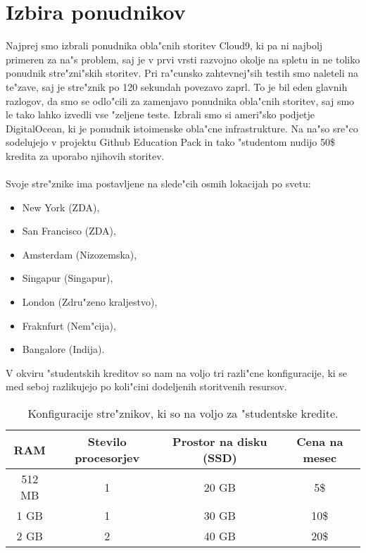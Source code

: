 \null
\vfill
\clearpage

\section{Izbira ponudnikov}
Najprej smo izbrali ponudnika obla"cnih storitev Cloud9, ki pa ni najbolj primeren za na"s problem, saj je v prvi vrsti razvojno okolje na spletu in ne toliko ponudnik stre"zni"skih storitev. Pri ra"cunsko zahtevnej"sih testih smo naleteli na te"zave, saj je stre"znik po 120 sekundah povezavo zaprl. To je bil eden glavnih razlogov, da smo se odlo"cili za zamenjavo ponudnika obla"cnih storitev, saj smo le tako lahko izvedli vse "zeljene teste. Izbrali smo si ameri"sko podjetje DigitalOcean, ki je ponudnik istoimenske obla"cne infrastrukture. Na na"so sre"co sodelujejo v projektu Github Education Pack in tako "studentom nudijo 50\$ kredita za uporabo njihovih storitev.\\\\Svoje stre"znike ima postavljene na slede"cih osmih lokacijah po svetu:
\begin{itemize}
\item New York (ZDA),
\item San Francisco (ZDA),
\item Amsterdam (Nizozemska),
\item Singapur (Singapur),
\item London (Zdru"zeno kraljestvo),
\item Fraknfurt (Nem"cija),
\item Bangalore (Indija).
\end{itemize}
V okviru "studentskih kreditov so nam na voljo tri razli"cne konfiguracije, ki se med seboj razlikujejo po koli"cini dodeljenih storitvenih resursov.

\begin{table}[!htbp]
  \centering
  \begin{tabular}{ | c | c | c | c | }
    \hline
    RAM & Stevilo procesorjev & Prostor na disku (SSD) & Cena na mesec\\ \hline
    512 MB & 1     & 20 GB &  5\$ \\ \hline
    1 GB & 1 & 30 GB & 10\$ \\ \hline
    2 GB & 2 & 40 GB & 20\$ \\ \hline
  \end{tabular}
  \caption{Konfiguracije stre"znikov, ki so na voljo za "studentske kredite.}
  \label{8_table1}
  \centering
\end{table}



